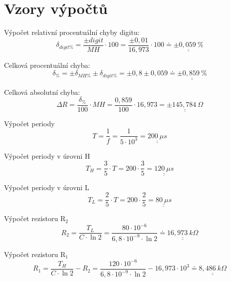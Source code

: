 \section{Vzory výpočtů}
  
  Výpočet relativní procentuální chyby digitu:
  \begin{equation}
    \delta _{digit\%} = \dfrac{\pm digit}{MH} \cdot 100 = \dfrac{\pm 0,01}{16,973} \cdot 100 \doteq \underline{\underline{\pm 0,059~\%}}
    \nonumber
  \end{equation}
  
  Celková procentuální chyba:
  \begin{equation}
    \delta_{\%} = \pm\delta_{MH\%} \pm \delta_{digit\%} = \pm 0,8 \pm 0,059 \doteq \underline{\underline{\pm 0,859~\%}}
    \nonumber
  \end{equation}
  
  Celková absolutní chyba:
  \begin{equation}
    \Delta R = \dfrac{\delta_\%}{100} \cdot MH = \dfrac{0,859}{100} \cdot 16,973 = \underline{\underline{\pm 145,784~\Omega}}
    \nonumber
  \end{equation}
  
  Výpočet periody
  \begin{equation}
    T = \dfrac{1}{f} =  \dfrac{1}{5 \cdot 10^3} = \underline{\underline{200~\mu s}}
    \nonumber
  \end{equation}
  
  Výpočet periody v úrovni H
  \begin{equation}
    T_H = \dfrac{3}{5} \cdot T =  200 \cdot \dfrac{3}{5} = \underline{\underline{120~\mu s}}
    \nonumber
  \end{equation}
  
  Výpočet periody v úrovni L
  \begin{equation}
    T_L = \dfrac{2}{5} \cdot T =  200 \cdot \dfrac{2}{5} = \underline{\underline{80~\mu s}}
    \nonumber
  \end{equation}
  
  Výpočet rezistoru R$_2$
  \begin{equation}
    R_2 = \dfrac{T_L}{C\cdot\ln2} =  \dfrac{80\cdot10^{-6}}{6,8\cdot10^{-9}\cdot\ln2} \doteq \underline{\underline{16,973~k\Omega}}
    \nonumber
  \end{equation}
  
  Výpočet rezistoru R$_1$
  \begin{equation}
    R_1 = \dfrac{T_H}{C\cdot\ln2} - R_2 =  \dfrac{120\cdot10^{-6}}{6,8\cdot10^{-9}\cdot\ln2} - 16,973 \cdot 10^3 \doteq \underline{\underline{8,486~k\Omega}}
    \nonumber
  \end{equation}
